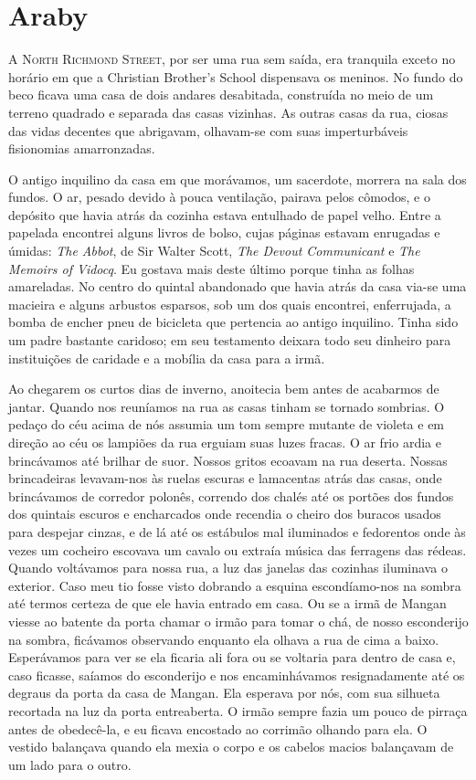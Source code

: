 \chapter{Araby}

\textsc{A North Richmond Street,} por ser uma rua sem saída, era tranquila
exceto no horário em que a Christian Brother’s School dispensava os meninos.
No fundo do beco ficava uma casa de dois andares desabitada, construída no meio
de um terreno quadrado e separada das casas vizinhas.  As outras casas da rua,
ciosas das vidas decentes que abrigavam, olhavam-se com suas imperturbáveis
fisionomias amarronzadas.

O antigo inquilino da casa em que morávamos, um sacerdote, morrera na sala dos
fundos.  O ar, pesado devido à pouca ventilação, pairava pelos cômodos, e o
depósito que havia atrás da cozinha estava entulhado de papel velho.  Entre a
papelada encontrei alguns livros de bolso, cujas páginas estavam enrugadas e
úmidas: \textit{The Abbot}, de Sir Walter Scott, \textit{The Devout
Communicant} e \textit{The Memoirs of Vidocq}.  Eu gostava mais deste último
porque tinha as folhas amareladas.  No centro do quintal abandonado que havia
atrás da casa via-se uma macieira e alguns arbustos esparsos, sob um dos quais
encontrei, enferrujada, a bomba de encher pneu de bicicleta que pertencia ao
antigo inquilino.  Tinha sido um padre bastante caridoso; em seu testamento
deixara todo seu dinheiro para instituições de caridade e a mobília da casa
para a irmã.

Ao chegarem os curtos dias de inverno, anoitecia bem antes de acabarmos de
jantar.  Quando nos reuníamos na rua as casas tinham se tornado sombrias.  O
pedaço do céu acima de nós assumia um tom sempre mutante de violeta e em
direção ao céu os lampiões da rua erguiam suas luzes fracas.  O ar frio ardia e
brincávamos até brilhar de suor.  Nossos gritos ecoavam na rua deserta.  Nossas
brincadeiras levavam-nos às ruelas escuras e lamacentas atrás das casas, onde
brincávamos de corredor polonês, correndo dos chalés até os portões dos fundos
dos quintais escuros e encharcados onde recendia o cheiro dos buracos usados
para despejar cinzas, e de lá até os estábulos mal iluminados e fedorentos onde
às vezes um cocheiro escovava um cavalo ou extraía música das ferragens das
rédeas.  Quando voltávamos para nossa rua, a luz das janelas das cozinhas
iluminava o exterior.  Caso meu tio fosse visto dobrando a esquina
escondíamo-nos na sombra até termos certeza de que ele havia entrado em casa.
Ou se a irmã de Mangan viesse ao batente da porta chamar o irmão para tomar o
chá, de nosso esconderijo na sombra, ficávamos observando enquanto ela olhava a
rua de cima a baixo.  Esperávamos para ver se ela ficaria ali fora ou se
voltaria para dentro de casa e, caso ficasse, saíamos do esconderijo e nos
encaminhávamos resignadamente até os degraus da porta da casa de Mangan.  Ela
esperava por nós, com sua silhueta recortada na luz da porta entreaberta.  O
irmão sempre fazia um pouco de pirraça antes de obedecê-la, e eu ficava
encostado ao corrimão olhando para ela.  O vestido balançava quando ela mexia o
corpo e os cabelos macios balançavam de um lado para o outro.

